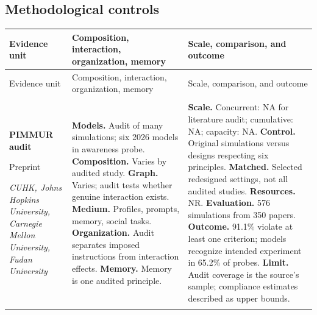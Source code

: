 \subsection{Methodological controls}
\begingroup
\small
\setlength{\tabcolsep}{5pt}
\renewcommand{\arraystretch}{1.13}
\begin{longtable}{@{}>{\raggedright\arraybackslash}p{}>{\raggedright\arraybackslash}p{}>{\raggedright\arraybackslash}p{}@{}}
\toprule
Evidence unit & Composition, interaction, organization, memory & Scale, comparison, and outcome \\
\midrule
\endfirsthead
\toprule
Evidence unit & Composition, interaction, organization, memory & Scale, comparison, and outcome \\
\midrule
\endhead
\midrule
\multicolumn{3}{r}{Continued on next page}\\
\endfoot
\bottomrule
\endlastfoot
\textbf{PIMMUR audit}\par \citep{pimmur-principles}\par Preprint\par\emph{CUHK, Johns Hopkins University, Carnegie Mellon University, Fudan University} & \textbf{Models.} Audit of many simulations; six 2026 models in awareness probe. \textbf{Composition.} Varies by audited study. \textbf{Graph.} Varies; audit tests whether genuine interaction exists. \textbf{Medium.} Profiles, prompts, memory, social tasks. \textbf{Organization.} Audit separates imposed instructions from interaction effects. \textbf{Memory.} Memory is one audited principle. & \textbf{Scale.} Concurrent: NA for literature audit; cumulative: NA; capacity: NA. \textbf{Control.} Original simulations versus designs respecting six principles. \textbf{Matched.} Selected redesigned settings, not all audited studies. \textbf{Resources.} NR. \textbf{Evaluation.} 576 simulations from 350 papers. \textbf{Outcome.} 91.1\% violate at least one criterion; models recognize intended experiment in 65.2\% of probes. \textbf{Limit.} Audit coverage is the source's sample; compliance estimates described as upper bounds. \\ \addlinespace[5pt]

\end{longtable}
